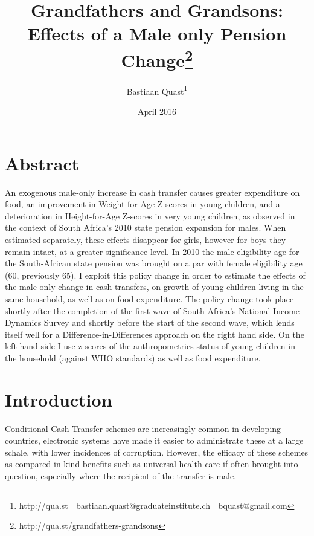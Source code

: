 \documentclass[a4paper,british]{article}\usepackage[]{graphicx}\usepackage[]{color}
\begin{document}
\title{Grandfathers and Grandsons:\\Effects of a Male only Pension Change\thanks{http://qua.st/grandfathers-grandsons}}

\author{Bastiaan Quast\thanks{http://qua.st | bastiaan.quast@graduateinstitute.ch | bquast@gmail.com}}

\date{April 2016}
\maketitle

\section*{Abstract}

An exogenous male-only increase in cash transfer causes greater expenditure
on food, an improvement in Weight-for-Age Z-scores in young children,
and a deterioration in Height-for-Age Z-scores in very young children,
as observed in the context of South Africa's 2010 state pension expansion
for males. When estimated separately, these effects disappear for
girls, however for boys they remain intact, at a greater significance
level. In 2010 the male eligibility age for the South-African state
pension was brought on a par with female eligibility age (60, previously
65). I exploit this policy change in order to estimate the effects
of the male-only change in cash transfers, on growth of young children
living in the same household, as well as on food expenditure. The
policy change took place shortly after the completion of the first
wave of South Africa's National Income Dynamics Survey and shortly
before the start of the second wave, which lends itself well for a
Difference-in-Differences approach on the right hand side. On the
left hand side I use z-scores of the anthropometrics status of young
children in the household (against WHO standards) as well as food
expenditure.




\section{Introduction}

\label{sec:intro} Conditional Cash Transfer schemes are increasingly
common in developing countries, electronic systems have made it easier
to administrate these at a large schale, with lower incidences of
corruption. However, the efficacy of these schemes as compared in-kind
benefits such as universal health care if often brought into question,
especially where the recipient of the transfer is male. 
\end{document}
